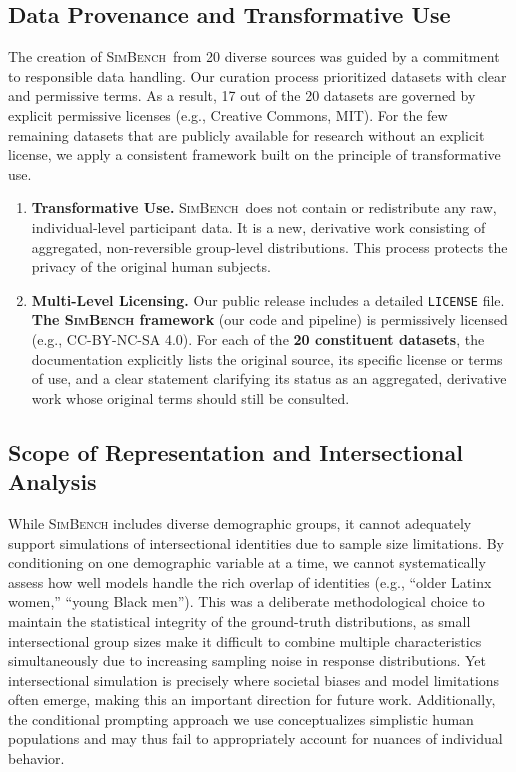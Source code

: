 \documentclass{article} %
\begin{document}
\subsection*{Data Provenance and Transformative Use}
The creation of \textsc{SimBench}\ from 20 diverse sources was guided by a commitment to responsible data handling. Our curation process prioritized datasets with clear and permissive terms. As a result, 17 out of the 20 datasets are governed by explicit permissive licenses (e.g., Creative Commons, MIT). For the few remaining datasets that are publicly available for research without an explicit license, we apply a consistent framework built on the principle of transformative use. 

\begin{enumerate}[nosep, leftmargin=*]
    \item \textbf{Transformative Use.} \textsc{SimBench}\ does not contain or redistribute any raw, individual-level participant data. It is a new, derivative work consisting of aggregated, non-reversible group-level distributions. This process protects the privacy of the original human subjects.

    \item \textbf{Multi-Level Licensing.} Our public release includes a detailed \texttt{LICENSE} file. \textbf{The \textsc{SimBench} framework} (our code and pipeline) is permissively licensed (e.g., CC-BY-NC-SA 4.0). For each of the \textbf{20 constituent datasets}, the documentation explicitly lists the original source, its specific license or terms of use, and a clear statement clarifying its status as an aggregated, derivative work whose original terms should still be consulted.
\end{enumerate}

\subsection*{Scope of Representation and Intersectional Analysis}

While \textsc{SimBench} includes diverse demographic groups, it cannot adequately support simulations of intersectional identities due to sample size limitations.
By conditioning on one demographic variable at a time, we cannot systematically assess how well models handle the rich overlap of identities (e.g., ``older Latinx women,'' ``young Black men''). This was a deliberate methodological choice to maintain the statistical integrity of the ground-truth distributions, as small intersectional group sizes make it difficult to combine multiple characteristics simultaneously due to increasing sampling noise in response distributions.
Yet intersectional simulation is precisely where societal biases and model limitations often emerge, making this an important direction for future work.
Additionally, the conditional prompting approach we use conceptualizes simplistic human populations and may thus fail to appropriately account for nuances of individual behavior.
\end{document}

